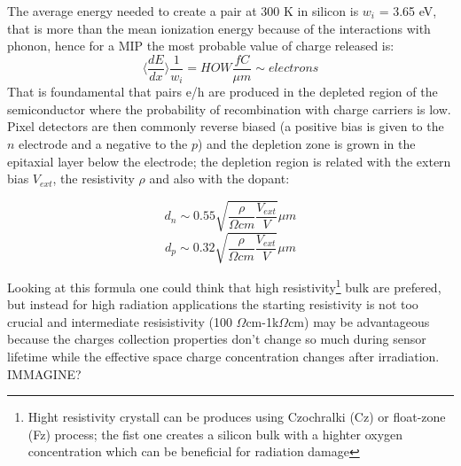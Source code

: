 \begin{titlepage}
The average energy needed to create a pair at 300 K in silicon is $w_i$ = 3.65 eV, that is more than the mean ionization energy because of the interactions with phonon, hence for a MIP the most probable value of charge released is: 
\begin{equation}
   \langle \frac{dE}{dx}\rangle \frac{1}{w_i} = HOW \frac{fC}{\mu m} \sim electrons
\end{equation}
That is foundamental that pairs e/h are produced in the depleted region of the semiconductor where the probability of recombination with charge carriers is low.\\
Pixel detectors are then commonly reverse biased (a positive bias is given to the $n$ electrode and a negative to the $p$) and the depletion zone is grown in the epitaxial layer below the electrode; the depletion region is related with the extern bias $V_{ext}$, the resistivity $\rho$ and also with the dopant:
\begin{multicols}{2}
\begin{equation}
   d_{n} \sim 0.55 \sqrt{\frac{\rho}{\Omega cm}\frac{V_{ext}}{V}} \mu m 
\end{equation}\break
\begin{equation}
   d_{p} \sim 0.32 \sqrt{\frac{\rho}{\Omega cm}\frac{V_{ext}}{V}} \mu m
\end{equation}
\label{eq:deplation_d}
\end{multicols}
Looking at this formula one could think that high resistivity\footnote{Hight resistivity crystall can be produces using Czochralki (Cz) or float-zone (Fz) process; the fist one creates a silicon bulk with a highter oxygen concentration which can be beneficial for radiation damage} bulk are prefered, but instead for high radiation applications the starting resistivity is not too crucial and intermediate resisistivity (100 $\Omega$cm-1k$\Omega$cm) may be advantageous because the charges collection properties don't change so much during sensor lifetime while the effective space charge concentration changes after irradiation. IMMAGINE?\\


\end{titlepage}
